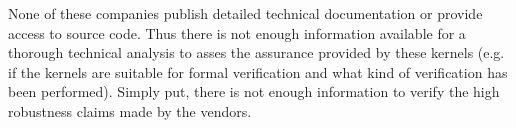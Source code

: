 None of these companies publish detailed technical documentation or provide
access to source code. Thus there is not enough information available for a
thorough technical analysis to asses the assurance provided by these kernels
(e.g. if the kernels are suitable for formal verification and what kind of
verification has been performed). Simply put, there is not enough information
to verify the high robustness claims made by the vendors.
